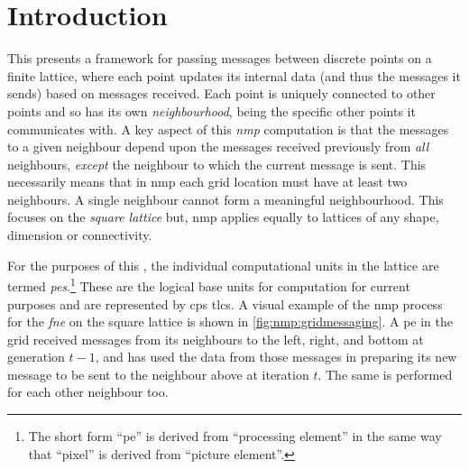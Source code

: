 \section{Introduction}
This  presents a framework for passing messages between discrete points on a finite lattice, where each point updates its internal data (and thus the messages it sends) based on messages received.  Each point is uniquely connected to other points and so has its own \emph{neighbourhood}, being the specific other points it communicates with.  A key aspect of this \emph{\gls{nmp}} computation is that the messages to a given neighbour depend upon the messages received previously from \emph{all} neighbours, \emph{except} the neighbour to which the current message is sent.    This necessarily means that in \gls{nmp} each grid location must have at least two neighbours.  A single neighbour cannot form a meaningful neighbourhood.  This  focuses on the \emph{square lattice} but, \gls{nmp} applies equally to lattices of any shape, dimension or connectivity.

For the purposes of this , the individual computational units in the lattice are termed \emph{\glspl{pe}}.\footnote{The short form ``\gls{pe}'' is derived from ``processing element'' in the same way that ``pixel'' is derived from ``picture element''.}  These are the logical base units for computation for current purposes and are represented by \gls{cps} \glspl{tlc}.  A visual example of the \gls{nmp} process for the \emph{\gls{fne}} on the square lattice is shown in \cref{fig:nmp:gridmessaging}.  A \gls{pe} in the grid received messages from its neighbours to the left, right, and bottom at generation \(t - 1\), and has used the data from those messages in preparing its new message to be sent to the neighbour above at iteration \(t\).  The same is performed for each other neighbour too.

